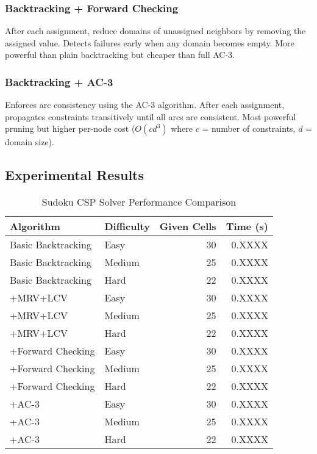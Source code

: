 \documentclass[letterpaper]{article}
\begin{document}
\subsubsection{Backtracking + Forward Checking}
After each assignment, reduce domains of unassigned neighbors by removing the assigned value. Detects failures early when any domain becomes empty. More powerful than plain backtracking but cheaper than full AC-3.

\subsubsection{Backtracking + AC-3}
Enforces arc consistency using the AC-3 algorithm. After each assignment, propagates constraints transitively until all arcs are consistent. Most powerful pruning but higher per-node cost ($O(cd^3)$ where $c$ = number of constraints, $d$ = domain size).

\subsection{Experimental Results}


\begin{table}[h]
\centering
\caption{Sudoku CSP Solver Performance Comparison}
\label{tab:sudoku-results}
\begin{tabular}{@{}llrr@{}}
\toprule
Algorithm & Difficulty & Given Cells & Time (s) \\
\midrule
Basic Backtracking & Easy & 30 & 0.XXXX \\
Basic Backtracking & Medium & 25 & 0.XXXX \\
Basic Backtracking & Hard & 22 & 0.XXXX \\
\midrule
+MRV+LCV & Easy & 30 & 0.XXXX \\
+MRV+LCV & Medium & 25 & 0.XXXX \\
+MRV+LCV & Hard & 22 & 0.XXXX \\
\midrule
+Forward Checking & Easy & 30 & 0.XXXX \\
+Forward Checking & Medium & 25 & 0.XXXX \\
+Forward Checking & Hard & 22 & 0.XXXX \\
\midrule
+AC-3 & Easy & 30 & 0.XXXX \\
+AC-3 & Medium & 25 & 0.XXXX \\
+AC-3 & Hard & 22 & 0.XXXX \\
\bottomrule
\end{tabular}
\end{table}
\end{document}
